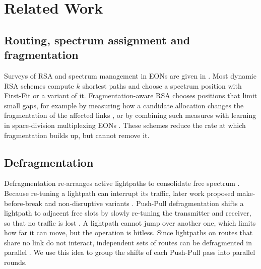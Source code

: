 \documentclass[preprint,12pt]{elsarticle}
\begin{document}
\section{Related Work}\label{sec:related}
\subsection{Routing, spectrum assignment and fragmentation}
Surveys of RSA and spectrum management in EONs are given in \cite{chatterjee2015,abkenar2017,talebi2014}. Most dynamic RSA schemes compute $k$ shortest paths \cite{yen1971} and choose a spectrum position with First-Fit or a variant of it. Fragmentation-aware RSA chooses positions that limit small gaps, for example by measuring how a candidate allocation changes the fragmentation of the affected links \cite{shen2015}, or by combining such measures with learning in space-division multiplexing EONs \cite{athari2019}. These schemes reduce the rate at which fragmentation builds up, but cannot remove it.

\subsection{Defragmentation}
Defragmentation re-arranges active lightpaths to consolidate free spectrum \cite{patel2011}. Because re-tuning a lightpath can interrupt its traffic, later work proposed make-before-break and non-disruptive variants \cite{wang2013,zhang2013}. Push-Pull defragmentation shifts a lightpath to adjacent free slots by slowly re-tuning the transmitter and receiver, so that no traffic is lost \cite{cugini2013}. A lightpath cannot jump over another one, which limits how far it can move, but the operation is hitless. Since lightpaths on routes that share no link do not interact, independent sets of routes can be defragmented in parallel \cite{shakya2013}. We use this idea to group the shifts of each Push-Pull pass into parallel rounds.
\end{document}

